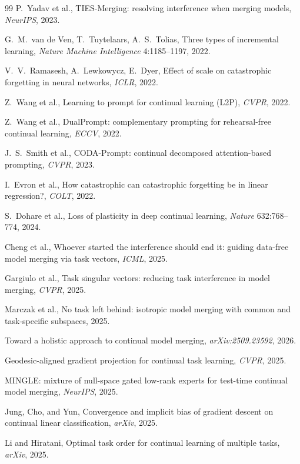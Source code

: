 \documentclass[10pt,a4paper]{article}
\theoremstyle{plain}
\theoremstyle{definition}
\begin{document}
\begin{thebibliography}{99}
 P.~Yadav et al., TIES-Merging: resolving interference when merging models,
\textit{NeurIPS}, 2023.

 G.~M.~van de Ven, T.~Tuytelaars, A.~S.~Tolias, Three types of incremental
learning, \textit{Nature Machine Intelligence} 4:1185--1197, 2022.

 V.~V.~Ramasesh, A.~Lewkowycz, E.~Dyer, Effect of scale on catastrophic
forgetting in neural networks, \textit{ICLR}, 2022.

 Z.~Wang et al., Learning to prompt for continual learning (L2P),
\textit{CVPR}, 2022.

 Z.~Wang et al., DualPrompt: complementary prompting for
rehearsal-free continual learning, \textit{ECCV}, 2022.

 J.~S.~Smith et al., CODA-Prompt: continual decomposed attention-based
prompting, \textit{CVPR}, 2023.

 I.~Evron et al., How catastrophic can catastrophic forgetting be in linear
regression?, \textit{COLT}, 2022.

 S.~Dohare et al., Loss of plasticity in deep continual learning,
\textit{Nature} 632:768--774, 2024.

 Cheng et al., Whoever started the interference should end it: guiding
data-free model merging via task vectors, \textit{ICML}, 2025.

 Gargiulo et al., Task singular vectors: reducing task interference in
model merging, \textit{CVPR}, 2025.

 Marczak et al., No task left behind: isotropic model merging with
common and task-specific subspaces, 2025.

 Toward a holistic approach to continual model merging,
\textit{arXiv:2509.23592}, 2026.

 Geodesic-aligned gradient projection for continual task learning,
\textit{CVPR}, 2025.

 MINGLE: mixture of null-space gated low-rank experts for test-time
continual model merging, \textit{NeurIPS}, 2025.

 Jung, Cho, and Yun, Convergence and implicit bias of gradient descent on
continual linear classification, \textit{arXiv}, 2025.

 Li and Hiratani, Optimal task order for continual learning of multiple
tasks, \textit{arXiv}, 2025.


\end{thebibliography}
\end{document}
